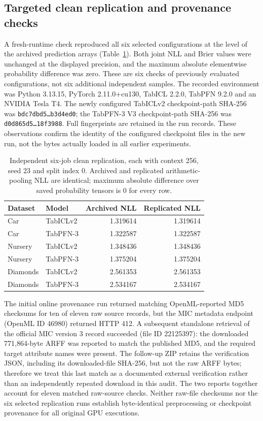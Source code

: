 \documentclass[a4paper,fleqn]{cas-sc}
\begin{document}
\subsection{Targeted clean replication and provenance checks}
A fresh-runtime check reproduced all six selected configurations at the level of the archived prediction arrays (Table~\ref{tab:cleanrep}). Both joint NLL and Brier values were unchanged at the displayed precision, and the maximum absolute elementwise probability difference was zero. These are six checks of previously evaluated configurations, not six additional independent samples. The recorded environment was Python 3.13.15, PyTorch 2.11.0+cu130, TabICL 2.2.0, TabPFN 9.2.0 and an NVIDIA Tesla T4. The newly configured TabICLv2 checkpoint-path SHA-256 was \texttt{bdc7dbd5\ldots b3d4ed0}; the TabPFN-3 V3 checkpoint-path SHA-256 was \texttt{d0d865d5\ldots 18f3988}. Full fingerprints are retained in the run records. These observations confirm the identity of the configured checkpoint files in the new run, not the bytes actually loaded in all earlier experiments.

\begin{table}[htbp]
\centering
\caption{Independent six-job clean replication, each with context 256, seed 23 and split index 0. Archived and replicated arithmetic-pooling NLL are identical; maximum absolute difference over saved probability tensors is 0 for every row.}
\label{tab:cleanrep}
\begin{tabular}{llrr}
\toprule
Dataset & Model & Archived NLL & Replicated NLL\\
\midrule
Car & TabICLv2 & 1.319614 & 1.319614\\
Car & TabPFN-3 & 1.322587 & 1.322587\\
Nursery & TabICLv2 & 1.348436 & 1.348436\\
Nursery & TabPFN-3 & 1.375204 & 1.375204\\
Diamonds & TabICLv2 & 2.561353 & 2.561353\\
Diamonds & TabPFN-3 & 2.534167 & 2.534167\\
\bottomrule
\end{tabular}
\end{table}

The initial online provenance run returned matching OpenML-reported MD5 checksums for ten of eleven raw source records, but the MIC metadata endpoint (OpenML ID 46980) returned HTTP 412. A subsequent standalone retrieval of the official MIC version 3 record succeeded (file ID 22125397): the downloaded 771,864-byte ARFF was reported to match the published MD5, and the required target attribute names were present. The follow-up ZIP retains the verification JSON, including its downloaded-file SHA-256, but not the raw ARFF bytes; therefore we treat this last match as a documented external verification rather than an independently repeated download in this audit. The two reports together account for eleven matched raw-source checks. Neither raw-file checksums nor the six selected replication runs establish byte-identical preprocessing or checkpoint provenance for all original GPU executions.
\end{document}

